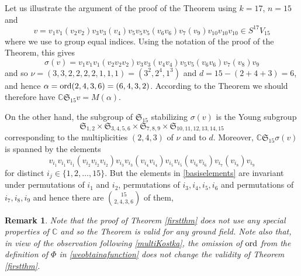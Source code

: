 \documentclass[10pt,hidelinks]{article}
\newcommand{\ord}{{\rm{ord}}}
\newcommand{\CC}{ \mathbb C }
\newcommand{\Si}{\mathfrak{S}}
\newtheorem{remark}{Remark}
\numberwithin{equation}{section}
\begin{document}
\medskip
Let us illustrate the argument of the proof of the Theorem using $ k = 17$, $ n = 15 $ and
\begin{equation}
v= v_1 v_1 ( v_2 v_2 ) v_3 v_3  ( v_4 )   v_5 v_5 v_5  (v_6 v_6 ) v_7 (  v_9 ) v_{10} v_{10} v_{10}  \in  S^{17} V_{15} 
\end{equation}
where we use
{\color{black}{parentheses}} to group equal indices. Using the notation of the proof of the
Theorem, this gives   
\begin{equation}
  \sigma(v)= v_1 v_1  v_1( v_2  v_2 v_2  ) v_3 v_3  ( v_4 v_4  )   v_5 v_5   (v_6 v_6 ) v_7 (  v_8 ) v_{9}
  \end{equation}
and so $ \nu = (3,3,2,2,2,2,1,1,1) = (3^2, 2^4, 1^3) $ and $ d = 15- (2+4+3)  = 6 $,
and hence $ \alpha=\ord(2,4,3,6) =  (6,4,3,2) $. According to the Theorem we should therefore have
$  \CC \Si_{15} v = M(\alpha) $.

\medskip
On the other hand, the subgroup of $ \Si_{15} $ stabilizing $ \sigma(v) $ is
the Young subgroup
\begin{equation}
\Si_{1,2} \times \Si_{3,4,5,6} \times \Si_{7,8,9} \times \Si_{10,11,12,13,14,15} 
\end{equation}
corresponding to the multiplicities $ (2,4,3) $ of $ \nu $ and to $ d $. 
Moreover, $ \CC \Si_{15} \sigma(v)$ is spanned by the elements 
\begin{equation}\label{basiselements}
  v_{i_1} v_{i_1}  v_{i_1}( v_{i_2}  v_{i_2} v_{i_2}  ) v_{i_3} v_{i_3}  ( v_{i_4} v_{i_4}  )   v_{i_5} v_{i_5}
  (v_{i_6} v_{i_6} ) v_{i_7} (  v_{i_8} ) v_{i_9}
  \end{equation}
for distinct $ i_j  \in \{1,2,\ldots, 15 \} $. But the elements in \eqref{basiselements}
are invariant under
permutations of $ i_1 $ and $ i_2 $, permutations of $ i_3, i_4, i_5, i_6 $
and permutations of $ i_7, i_8, i_9 $
and hence there are
$ \binom{15}{ 2,  4,  3 ,6} $ of them, {\color{black}{as expected.}}


\begin{remark}
  \normalfont
  Note that the proof of Theorem \ref{firstthm} does not use any special properties of $ \CC $ and so
  the Theorem is valid for any ground field. 
  Note also that, in view of the observation following \eqref{multiKostka}, the
  omission of $ \ord $ from the definition of $ \Phi $ in \eqref{weobtainafunction}
  does not change the validity 
  of Theorem \ref{firstthm}. 
  \end{remark}
\end{document}
